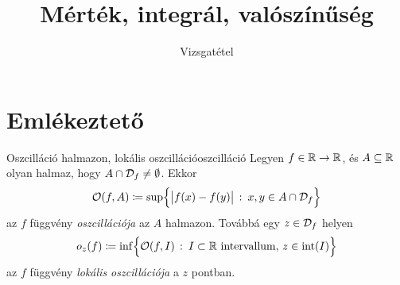 \documentclass[
]{elteikthesis}[2024/04/26]
\title{Mérték, integrál, valószínűség} %
\subtitle{\circled{2} Vizsgatétel}     %
\begin{document}
	
	
	\section{Emlékeztető}
	
		\begin{definition}{Oszcilláció halmazon, lokális oszcilláció}{oszcilláció}
		Legyen \( f \in \mathbb{R} \to \mathbb{R} \), és
		\( A \subseteq \mathbb{R} \) olyan halmaz, hogy \( A \cap \mathcal{D}_{f} \neq \emptyset \).
		Ekkor
		\[
			\mathcal{O}(f, A) \coloneq
			\sup \Bigl\{ 
				\abs\big{f(x) - f(y)} \ \colon\, x, y \in A \cap \mathcal{D}_{f}
			\Bigr\}
		\]
		az \( f \) függvény \emph{oszcillációja} az \( A \) halmazon.
		Továbbá egy \( z \in \mathcal{D}_{f} \) helyen
		\[
			o_z(f) \coloneq
			\inf \Bigl\{ 
				\mathcal{O}(f, I) \ \colon\, I \subset \mathbb{R} \text{ intervallum},\, z \in \operatorname{int}(I) 
			\Bigr\}
		\]
		az \( f \) függvény \emph{lokális oszcillációja} a \( z \) pontban.
	\end{definition}
	
	
%	
	
\end{document}

